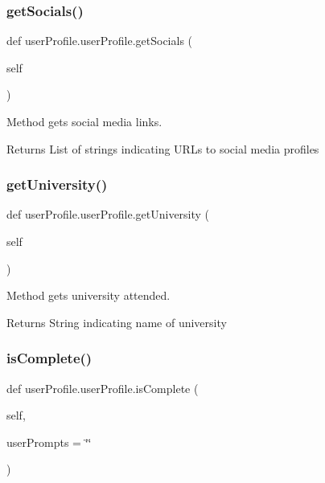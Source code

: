 \subsubsection{\texorpdfstring{get\+Socials()}{getSocials()}}
{\footnotesize\ttfamily def user\+Profile.\+user\+Profile.\+get\+Socials (\begin{DoxyParamCaption}\item[{}]{self }\end{DoxyParamCaption})}



Method gets social media links. 

\begin{DoxyReturn}{Returns}
List of strings indicating U\+R\+Ls to social media profiles 
\end{DoxyReturn}
\mbox{\label{classuserProfile_1_1userProfile_a25a425c5045c07739c784f7f8dcff2af}} 
\subsubsection{\texorpdfstring{get\+University()}{getUniversity()}}
{\footnotesize\ttfamily def user\+Profile.\+user\+Profile.\+get\+University (\begin{DoxyParamCaption}\item[{}]{self }\end{DoxyParamCaption})}



Method gets university attended. 

\begin{DoxyReturn}{Returns}
String indicating name of university 
\end{DoxyReturn}
\mbox{\label{classuserProfile_1_1userProfile_a805c57945934e5b839077ee8d8edfe5d}} 
\subsubsection{\texorpdfstring{is\+Complete()}{isComplete()}}
{\footnotesize\ttfamily def user\+Profile.\+user\+Profile.\+is\+Complete (\begin{DoxyParamCaption}\item[{}]{self,  }\item[{}]{user\+Prompts = {\ttfamily \char`\"{}\char`\"{}} }\end{DoxyParamCaption})}



